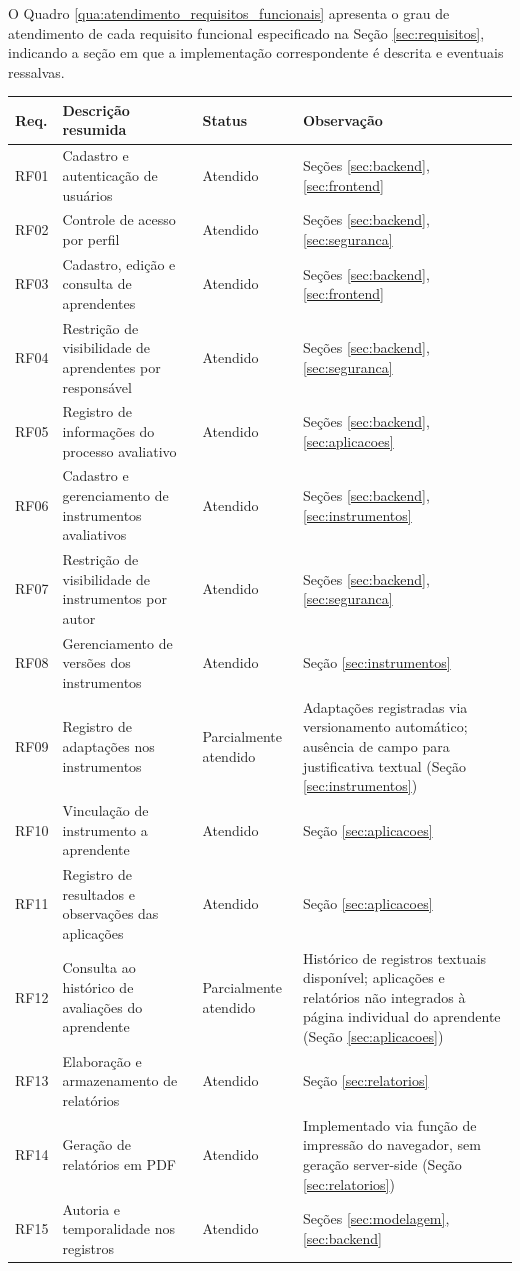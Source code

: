 O Quadro \ref{qua:atendimento_requisitos_funcionais} apresenta o grau de atendimento de cada requisito funcional especificado na Seção \ref{sec:requisitos}, indicando a seção em que a implementação correspondente é descrita e eventuais ressalvas.

\begin{quadro}[H]
\centering
\small
\caption{Atendimento aos requisitos funcionais}
\begin{tabular}{p{1.2cm} p{7.5cm} p{1.5cm} p{4cm}}
\hline
\textbf{Req.} & \textbf{Descrição resumida} & \textbf{Status} & \textbf{Observação} \\
\hline
RF01 & Cadastro e autenticação de usuários & Atendido & Seções \ref{sec:backend}, \ref{sec:frontend} \\
RF02 & Controle de acesso por perfil & Atendido & Seções \ref{sec:backend}, \ref{sec:seguranca} \\
RF03 & Cadastro, edição e consulta de aprendentes & Atendido & Seções \ref{sec:backend}, \ref{sec:frontend} \\
RF04 & Restrição de visibilidade de aprendentes por responsável & Atendido & Seções \ref{sec:backend}, \ref{sec:seguranca} \\
RF05 & Registro de informações do processo avaliativo & Atendido & Seções \ref{sec:backend}, \ref{sec:aplicacoes} \\
RF06 & Cadastro e gerenciamento de instrumentos avaliativos & Atendido & Seções \ref{sec:backend}, \ref{sec:instrumentos} \\
RF07 & Restrição de visibilidade de instrumentos por autor & Atendido & Seções \ref{sec:backend}, \ref{sec:seguranca} \\
RF08 & Gerenciamento de versões dos instrumentos & Atendido & Seção \ref{sec:instrumentos} \\
RF09 & Registro de adaptações nos instrumentos & Parcialmente atendido & Adaptações registradas via versionamento automático; ausência de campo para justificativa textual (Seção \ref{sec:instrumentos}) \\
RF10 & Vinculação de instrumento a aprendente & Atendido & Seção \ref{sec:aplicacoes} \\
RF11 & Registro de resultados e observações das aplicações & Atendido & Seção \ref{sec:aplicacoes} \\
RF12 & Consulta ao histórico de avaliações do aprendente & Parcialmente atendido & Histórico de registros textuais disponível; aplicações e relatórios não integrados à página individual do aprendente (Seção \ref{sec:aplicacoes}) \\
RF13 & Elaboração e armazenamento de relatórios & Atendido & Seção \ref{sec:relatorios} \\
RF14 & Geração de relatórios em PDF & Atendido & Implementado via função de impressão do navegador, sem geração server-side (Seção \ref{sec:relatorios}) \\
RF15 & Autoria e temporalidade nos registros & Atendido & Seções \ref{sec:modelagem}, \ref{sec:backend} \\
\hline
\end{tabular}
\label{qua:atendimento_requisitos_funcionais}
\end{quadro}

